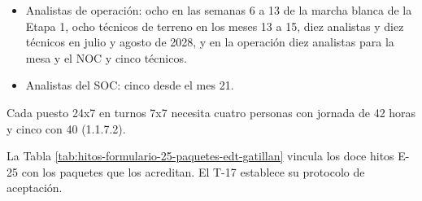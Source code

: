 \documentclass[formulario]{../../comun/overfore}
\begin{document}
\begin{itemize}
\item Analistas de operación: ocho en las semanas 6 a 13 de la marcha blanca de la Etapa 1, ocho técnicos de terreno en los meses 13 a 15, diez analistas y diez técnicos en julio y agosto de 2028, y en la operación diez analistas para la mesa y el NOC y cinco técnicos.
\item Analistas del SOC: cinco desde el mes 21.
\end{itemize}
Cada puesto 24x7 en turnos 7x7 necesita cuatro personas con jornada de 42 horas y cinco con 40 (1.1.7.2).

La Tabla \ref{tab:hitos-formulario-25-paquetes-edt-gatillan} vincula los doce hitos E-25 con los paquetes que los acreditan. El T-17 establece su protocolo de aceptación.
\end{document}
